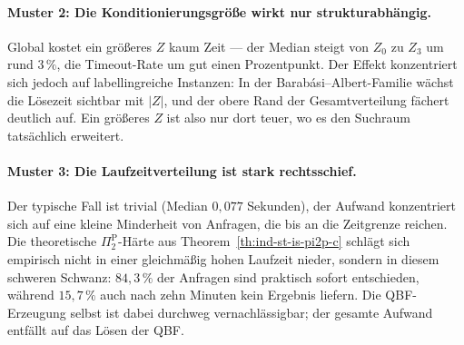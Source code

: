 \paragraph{Muster 2: Die Konditionierungsgr\"o\ss e wirkt nur strukturabh\"angig.}
Global kostet ein gr\"o\ss eres \(Z\) kaum Zeit --- der Median steigt von
\(Z_0\) zu \(Z_3\) um rund \(3\,\%\), die Timeout-Rate um gut einen
Prozentpunkt. Der Effekt konzentriert sich jedoch auf labellingreiche
Instanzen: In der Barab\'asi--Albert-Familie w\"achst die L\"osezeit sichtbar
mit \(|Z|\), und der obere Rand der Gesamtverteilung f\"achert deutlich auf.
Ein gr\"o\ss eres \(Z\) ist also nur dort teuer, wo es den Suchraum
tats\"achlich erweitert.

\paragraph{Muster 3: Die Laufzeitverteilung ist stark rechtsschief.} Der
typische Fall ist trivial (Median \(0{,}077\) Sekunden), der Aufwand
konzentriert sich auf eine kleine Minderheit von Anfragen, die bis an die
Zeitgrenze reichen. Die theoretische \(\Pi_2^{\mathrm P}\)-H\"arte aus
Theorem~\ref{th:ind-st-is-pi2p-c} schl\"agt sich empirisch nicht in einer
gleichm\"a\ss ig hohen Laufzeit nieder, sondern in diesem schweren Schwanz:
\(84{,}3\,\%\) der Anfragen sind praktisch sofort entschieden, w\"ahrend
\(15{,}7\,\%\) auch nach zehn Minuten kein Ergebnis liefern. Die QBF-Erzeugung
selbst ist dabei durchweg vernachl\"assigbar; der gesamte Aufwand entf\"allt
auf das L\"osen der QBF.
